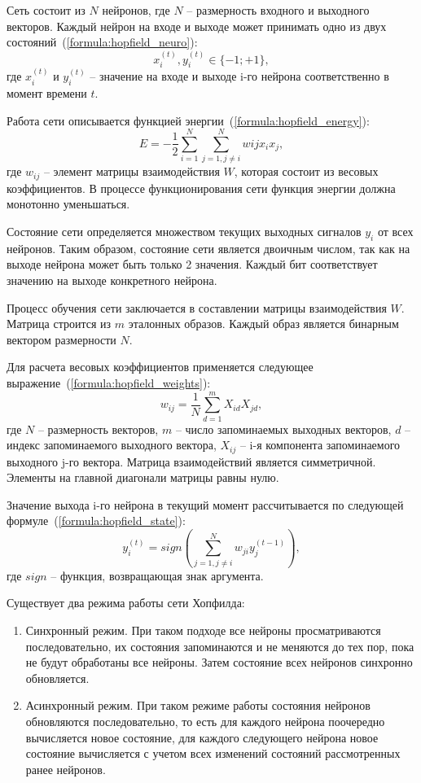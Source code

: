Сеть состоит из $N$ нейронов, где $N$ -- размерность входного и выходного векторов.
Каждый нейрон на входе и выходе может принимать одно из двух состояний~(\ref{formula:hopfield_neuro}):
\begin{equation}\label{formula:hopfield_neuro}
	x_i^{(t)}, y_i^{(t)} \in \{-1; +1\},
\end{equation}
где $x_i^{(t)}$ и $y_i^{(t)}$ -- значение на входе и выходе i-го нейрона соответственно в момент времени $t$.

Работа сети описывается функцией энергии~(\ref{formula:hopfield_energy}):
\begin{equation}\label{formula:hopfield_energy}
	E = -\frac{1}{2}\sum\limits_{i=1}^{N}\sum\limits_{j=1,j\neq i}^{N}w{ij}x_i x_j,
\end{equation}
где $w_{ij}$ -- элемент матрицы взаимодействия $W$, которая состоит из весовых коэффициентов.
В процессе функционирования сети функция энергии должна монотонно уменьшаться.

Состояние сети определяется множеством текущих выходных сигналов $y_i$ от всех нейронов.
Таким образом, состояние сети является двоичным числом, так как на выходе нейрона может быть только 2 значения.
Каждый бит соответствует значению на выходе конкретного нейрона.

Процесс обучения сети заключается в составлении матрицы взаимодействия $W$.
Матрица строится из $m$ эталонных образов.
Каждый образ является бинарным вектором размерности $N$.

Для расчета весовых коэффициентов применяется следующее выражение~(\ref{formula:hopfield_weights}):
\begin{equation}\label{formula:hopfield_weights}
	w_{ij} = \frac{1}{N}\sum\limits_{d=1}^{m}X_{id}X_{jd},
\end{equation}
где $N$ -- размерность векторов, $m$ -- число запоминаемых выходных векторов, $d$ -- индекс запоминаемого выходного вектора, $X_{ij}$ -- i-я компонента запоминаемого выходного j-го вектора.
Матрица взаимодействий является симметричной.
Элементы на главной диагонали матрицы равны нулю.

Значение выхода i-го нейрона в текущий момент рассчитывается по следующей формуле~(\ref{formula:hopfield_state}):
\begin{equation}\label{formula:hopfield_state}
	y_i^{(t)} = sign(\sum\limits_{j=1, j \neq i}^{N}w_{ji}y_j^{(t-1)}),
\end{equation}
где $sign$ -- функция, возвращающая знак аргумента.

Существует два режима работы сети Хопфилда:
\begin{enumerate}
	\item Синхронный режим. При таком подходе все нейроны просматриваются последовательно, их состояния запоминаются и не меняются до тех пор, пока не будут обработаны все нейроны. Затем состояние всех нейронов синхронно обновляется.
	\item Асинхронный режим. При таком режиме работы состояния нейронов обновляются последовательно, то есть для каждого нейрона поочередно вычисляется новое состояние, для каждого следующего нейрона новое состояние вычисляется с учетом всех изменений состояний рассмотренных ранее нейронов.
\end{enumerate}

